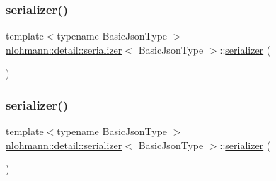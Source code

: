\subsubsection{\texorpdfstring{serializer()}{serializer()}\hspace{0.1cm}{\footnotesize\ttfamily [2/3]}}
{\footnotesize\ttfamily template$<$typename Basic\+Json\+Type $>$ \\
\mbox{\hyperlink{classnlohmann_1_1detail_1_1serializer}{nlohmann\+::detail\+::serializer}}$<$ Basic\+Json\+Type $>$\+::\mbox{\hyperlink{classnlohmann_1_1detail_1_1serializer}{serializer}} (\begin{DoxyParamCaption}\item[{const \mbox{\hyperlink{classnlohmann_1_1detail_1_1serializer}{serializer}}$<$ Basic\+Json\+Type $>$ \&}]{ }\end{DoxyParamCaption})\hspace{0.3cm}{\ttfamily [delete]}}

\mbox{\label{classnlohmann_1_1detail_1_1serializer_a28081304e70cca6b3042c101ee5c498c}} 
\subsubsection{\texorpdfstring{serializer()}{serializer()}\hspace{0.1cm}{\footnotesize\ttfamily [3/3]}}
{\footnotesize\ttfamily template$<$typename Basic\+Json\+Type $>$ \\
\mbox{\hyperlink{classnlohmann_1_1detail_1_1serializer}{nlohmann\+::detail\+::serializer}}$<$ Basic\+Json\+Type $>$\+::\mbox{\hyperlink{classnlohmann_1_1detail_1_1serializer}{serializer}} (\begin{DoxyParamCaption}\item[{\mbox{\hyperlink{classnlohmann_1_1detail_1_1serializer}{serializer}}$<$ Basic\+Json\+Type $>$ \&\&}]{ }\end{DoxyParamCaption})\hspace{0.3cm}{\ttfamily [delete]}}

\mbox{\label{classnlohmann_1_1detail_1_1serializer_aa6c62b51cbebb185307df851dc0167f0}} 
